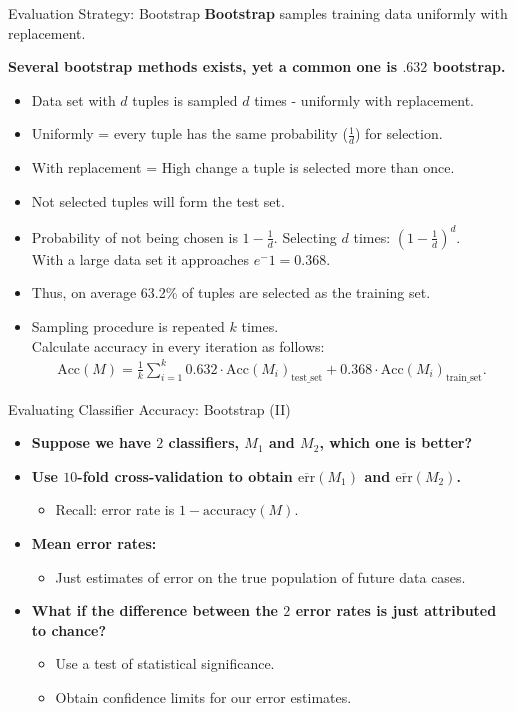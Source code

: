 \begin{frame}{Evaluation Strategy: Bootstrap}
	\textbf{Bootstrap} samples training data uniformly with replacement.

	\textbf{Several bootstrap methods exists, yet a common one is $.632$ bootstrap.}
	\begin{itemize}
		\item Data set with $d$ tuples is sampled $d$ times - uniformly with replacement.
		\item Uniformly = every tuple has the same probability ($\frac{1}{d}$) for selection.
		\item With replacement = High change a tuple is selected more than once.
		\item Not selected tuples will form the test set.
		\item Probability of not being chosen is $1-\frac{1}{d}$. Selecting $d$ times: $(1-\frac{1}{d})^d$.\\
		      With a large data set it approaches $e^-1=0.368$.
		\item Thus, on average 63.2\% of tuples are selected as the training set.
		\item Sampling procedure is repeated $k$ times.\\
		      Calculate accuracy in every iteration as follows:
		      \begin{align*}
			      \text{Acc}(M) = \frac{1}{k} \sum_{i=1}^{k} 0.632 \cdot \text{Acc}(M_i)_{\text{test\_set}} + 0.368 \cdot \text{Acc}(M_i)_{\text{train\_set}}.
		      \end{align*}
	\end{itemize}
\end{frame}

\begin{frame}{Evaluating Classifier Accuracy: Bootstrap (II)}
	\begin{itemize}
		\item \textbf{Suppose we have $2$ classifiers, $M_1$ and $M_2$, which one is better?}
		\item \textbf{Use $10$-fold cross-validation to obtain $\overline{\text{err}}(M_1)$ and $\overline{\text{err}}(M_2)$.}
		      \begin{itemize}
			      \item Recall: error rate is $1-\text{accuracy}(M)$.
		      \end{itemize}
		\item \textbf{Mean error rates:}
		      \begin{itemize}
			      \item Just estimates of error on the true population of future data cases.
		      \end{itemize}
		\item \textbf{What if the difference between the $2$ error rates is just attributed to chance?}
		      \begin{itemize}
			      \item Use a test of statistical significance.
			      \item Obtain confidence limits for our error estimates.
		      \end{itemize}
	\end{itemize}
\end{frame}

